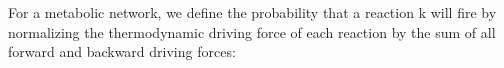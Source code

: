 For a metabolic network, we define the probability that a reaction k will fire by normalizing the thermodynamic driving force of each reaction by the sum of all forward and backward driving forces: